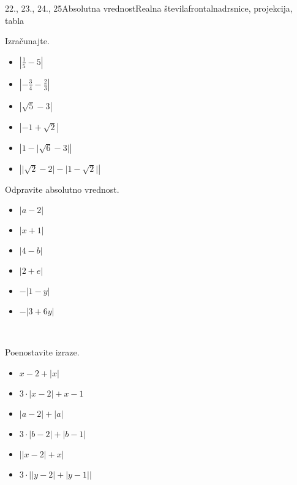\begin{priprava}{22., 23., 24., 25}{}{Absolutna vrednost}{Realna števila}{frontalna}{drsnice, projekcija, tabla}
\begin{multicols}{2}
\begin{naloga}
\begin{itemize}
    \end{itemize}
\end{naloga}


\begin{naloga}
    Izračunajte.
    \begin{itemize}
        \item $\left\lvert\frac{1}{5}-5\right\rvert$ 
        \item $\left\lvert-\frac{3}{4}-\frac{2}{3}\right\rvert$ 
        \item $\left\lvert\sqrt{5}-3\right\rvert$ 
        \item $\left\lvert-1+\sqrt{2}\right\rvert$ 
        \item $\left\lvert 1-\lvert\sqrt{6}-3\rvert\right\rvert$ 
        \item $\left\lvert\lvert\sqrt{2}-2\rvert-\lvert 1-\sqrt{2}\rvert\right\rvert$ 
            
    \end{itemize}
\end{naloga}



\begin{naloga}
    Odpravite absolutno vrednost.
    \begin{itemize}

        \item $\left\lvert a-2\right\rvert$ 
        \item $\left\lvert x+1\right\rvert$ 
        \item $\left\lvert 4-b\right\rvert$ 
        \item $\left\lvert 2+e\right\rvert$ 
        \item $-\left\lvert 1-y\right\rvert$ 
        \item $-\left\lvert 3+6y\right\rvert$ 
            
    \end{itemize}
\end{naloga}

~\\

\begin{naloga}
    Poenostavite izraze.
    \begin{itemize}
            \item $x-2+\left\lvert x\right\rvert$ 
            \item $3\cdot\left\lvert x-2\right\rvert +x-1$ 
            \item $\left\lvert a-2\right\rvert+\left\lvert a\right\rvert$ 
            \item $3\cdot \left\lvert b-2\right\rvert+\left\lvert b-1 \right\rvert$ 
            \item $\left\lvert \lvert x-2\rvert +x \right\rvert$ 
            \item $3\cdot \left\lvert \lvert y-2\rvert +\lvert y-1\rvert \right\rvert$ 


\end{itemize}
\end{naloga}
\end{multicols}
\end{priprava}
